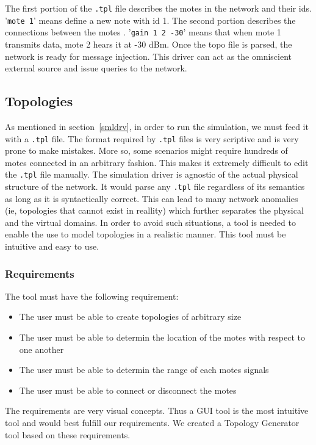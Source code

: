 \documentclass[11pt, titlepage, oneside]{article}
\begin{document}
The first portion of the {\tt *.tpl} file describes the motes in the network and their ids. '{\tt mote 1}' means define a new note with id 1. The second portion describes the connections between the motes . '{\tt gain 1 2 -30}' means that when mote 1 transmits data, mote 2 hears it at -30 dBm. Once the topo file is parsed, the network is ready for message injection. This driver can act as the omniscient external source and issue queries to the network. 
 
\subsection{Topologies} \label{tpls}
As mentioned in section~\ref{smldrv}, in order to run the simulation, we must feed it with a {\tt *.tpl} file. The format required by {\tt *.tpl} files is very scriptive and is very prone to make mistakes. More so, some scenarios might require hundreds of motes connected in an arbitrary fashion. This makes it extremely difficult to edit the {\tt *.tpl} file manually. The simulation driver is agnostic of the actual physical structure of the network. It would parse any {\tt *.tpl} file regardless of its semantics as long as it is syntactically correct. This can lead to many network anomalies (ie, topologies that cannot exist in reallity) which further separates the physical and the virtual domains. In order to avoid such situations, a tool is needed to enable the use to model topologies in a realistic manner. This tool must be intuitive and easy to use. 
 
\subsubsection{Requirements} 
The tool must have the following requirement: 
 
 
\begin{itemize} 
\item The user must be able to create topologies of arbitrary size 
\item The user must be able to determin the location of the motes with respect to one another
\item The user must be able to determin the range of each motes signals 
\item The user must be able to connect or disconnect the motes  
\end{itemize} 
The requirements are very visual concepts. Thus a GUI tool is the most intuitive tool and would best fulfill our requirements. We created a Topology Generator tool based on these requirements.
 
\end{document}
